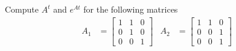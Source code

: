 \documentclass[10pt]{article}
\begin{document}
\section{}
Compute $A^t$ and $e^{At}$ for the following matrices
\begin{align}
  A_1 &=
  \begin{bmatrix}
    1 & 1 & 0 \\ 0 & 1 & 0 \\ 0 & 0 & 1
  \end{bmatrix}
  & A_2 &=
  \begin{bmatrix}
    1 & 1 & 0 \\ 0 & 0 & 1 \\ 0 & 0 & 1
  \end{bmatrix}
\end{align}

% 
% 
\end{document}
